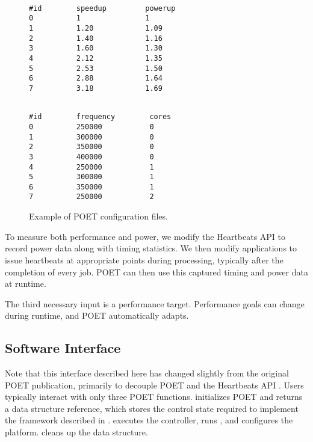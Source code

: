 \begin{figure}[t]
\centering
\begin{minipage}{.45\columnwidth}
\lstset{
  belowskip=0pt,
  aboveskip=0pt,
}
\begin{lstlisting}[frame=tlr,%
  caption={System-agnostic.},%
  label={lst:control_config_example}]%

#id        speedup         powerup
0          1               1
1          1.20            1.09
2          1.40            1.16
3          1.60            1.30
4          2.12            1.35
5          2.53            1.50
6          2.88            1.64
7          3.18            1.69
\end{lstlisting}
\end{minipage}
\hspace*{0.4cm}
\begin{minipage}{.45\columnwidth}
\lstset{
  belowskip=0pt,
  aboveskip=0pt,
}
\begin{lstlisting}[frame=tlr,%
  caption={System-specific.},%
  label={lst:cpu_config_example}]%

#id        frequency        cores
0          250000           0
1          300000           0
2          350000           0
3          400000           0
4          250000           1
5          300000           1
6          350000           1
7          250000           2
\end{lstlisting}
\end{minipage}
\caption{Example of POET configuration files.}
\label{fig:config-examples}
\end{figure}

To measure both performance and power, we modify the Heartbeats API \cite{PTRADE} to record power data along with timing statistics.
We then modify applications to issue heartbeats at appropriate points during processing, typically after the completion of every job.
POET can then use this captured timing and power data at runtime.

The third necessary input is a performance target.
Performance goals can change during runtime, and POET automatically adapts.


\subsection{Software Interface}
\label{sec:poet-interface}

Note that this interface described here has changed slightly from the original POET publication, primarily to decouple POET and the Heartbeats API \cite{POET}.
Users typically interact with only three POET functions.
 initializes POET and returns a  data structure reference, which stores the control state required to implement the framework described in .
 executes the controller, runs , and configures the platform.
 cleans up the  data structure.

